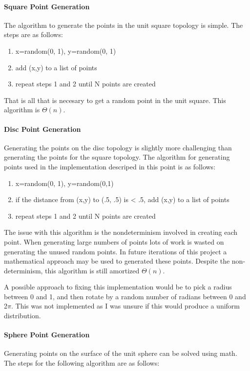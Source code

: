 \documentclass{article}
\begin{document}
  \paragraph{Square Point Generation}
		The algorithm to generate the points in the unit square topology is simple.
		The steps are as follows:
    \begin{enumerate}
      \item x=random(0, 1), y=random(0, 1)
      \item add (x,y) to a list of points
      \item repeat steps 1 and 2 until N points are created
    \end{enumerate}
    That is all that is necesary to get a random point in the unit square.
    This algorithm is $\Theta(n)$.

  \paragraph{Disc Point Generation}
		Generating the points on the disc topology is slightly more challenging than generating the points for the square topology.
    The algorithm for generating points used in the implementation descriped in this point is as follows:
    \begin{enumerate}
      \item x=random(0, 1), y=random(0,1)
      \item if the distance from (x,y) to (.5, .5) is < .5, add (x,y) to a list of points
      \item repeat steps 1 and 2 until N points are created
    \end{enumerate}
    The issue with this algorithm is the nondeterminism involved in creating each point.
    When generating large numbers of points lots of work is wasted on generating the unused random points.
    In future iterations of this project a mathematical approach may be used to generated these points.
    Despite the non-determinism, this algorithm is still amortized $\Theta(n)$.

    A possible approach to fixing this implementation would be to pick a radius between 0 and 1, and then rotate by a random number of radians between 0 and 2$\pi$.
    This was not implemented as I was unsure if this would produce a uniform distribution.

  \paragraph{Sphere Point Generation}
    Generating points on the surface of the unit sphere can be solved using math.
    The steps for the following algorithm are as follows:
\end{document}
